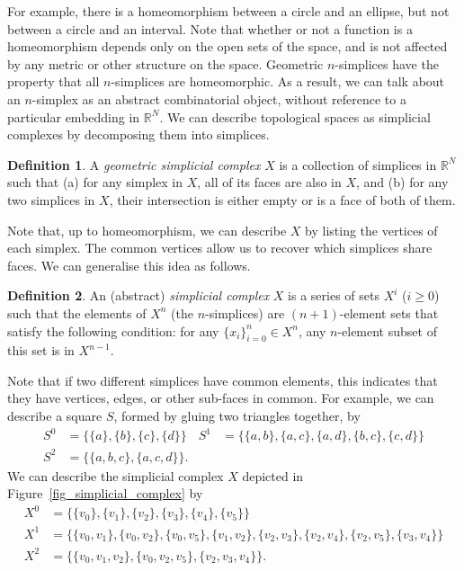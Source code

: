 \documentclass[a4paper,11pt,leqno]{article} \usepackage{amsmath}
\newcommand{\RR}{\mathbb{R}} \newcommand{\QQ}{\mathbb{Q}}
\theoremstyle{definition}
\newtheorem{defn}{Definition}
\begin{document}
For example, there is a homeomorphism between a circle and an ellipse, but not
between a circle and an interval.
Note that whether or not a function is a homeomorphism depends only on the open
sets of the space, and is not affected by any metric or other structure on the
space.
Geometric $n$-simplices have the property that all $n$-simplices are
homeomorphic.
As a result, we can talk about an $n$-simplex as an abstract combinatorial
object, without reference to a particular embedding in $\RR^N$.
We can describe topological spaces as simplicial complexes by decomposing them
into simplices.

\begin{defn}
  A \emph{geometric simplicial complex} $X$ is a collection of simplices in
  $\RR^N$ such that (a) for any simplex in $X$, all of its faces are also in
  $X$, and (b) for any two simplices in $X$, their intersection is either empty
  or is a face of both of them.
\end{defn}

Note that, up to homeomorphism, we can describe $X$ by listing the vertices of
each simplex.
The common vertices allow us to recover which simplices share faces.
We can generalise this idea as follows.

\begin{defn}
  An (abstract) \emph{simplicial complex} $X$ is a series of sets $X^i$ ($i\geq
  0$) such that the elements of $X^n$ (the $n$-simplices) are $(n+1)$-element
  sets that satisfy the following condition: for any $\{x_i\}_{i=0}^n\in X^n$,
  any $n$-element subset of this set is in $X^{n-1}$.
\end{defn}

Note that if two different simplices have common elements, this indicates that
they have vertices, edges, or other sub-faces in common.
For example, we can describe a square $S$, formed by gluing two triangles
together, by
\begin{align*}
  S^0	&=
  \{\{a\},\{b\},\{c\},\{d\}\} & S^1	&= \{\{a, b\}, \{a, c\}, \{a, d\}, \{b, c\},
  \{c, d\}\}\\ S^2	&= \{\{a,b,c\}, \{a,c,d\}\}.
\end{align*}
We can describe the
simplicial complex $X$ depicted in Figure~\ref{fig_simplicial_complex} by
\begin{align*}
  X^0	&= \{\{v_0\}, \{v_1\}, \{v_2\}, \{v_3\}, \{v_4\},
  \{v_5\}\}\\ X^1	&= \{\{v_0, v_1\}, \{v_0, v_2\}, \{v_0, v_5\}, \{v_1, v_2\},
  \{v_2, v_3\}, \{v_2, v_4\}, \{v_2, v_5\}, \{v_3, v_4\}\}\\ X^2	&= \{\{v_0,
  v_1, v_2\}, \{v_0, v_2, v_5\}, \{v_2, v_3, v_4\}\}.
\end{align*}
\end{document}
